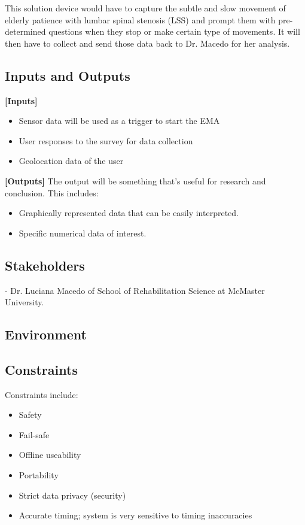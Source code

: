 \documentclass{article}
\begin{document}
This solution device would have to capture the subtle and slow movement of elderly patience with lumbar spinal stenosis (LSS) and prompt them with pre-determined questions when they stop or make certain type of  movements. It will then have to collect and send those data back to Dr. Macedo for her analysis.

\subsection{Inputs and Outputs}

\textbf{[Inputs]}
\begin{itemize}
    \item Sensor data will be used as a trigger to start the EMA
    \item User responses to the survey for data collection
    \item Geolocation data of the user
\end{itemize}
\pagebreak
\textbf{[Outputs]}
\linebreak
The output will be something that's useful for research and conclusion. This includes:
\begin{itemize}
    \item Graphically represented data that can be easily interpreted.
    \item Specific numerical data of interest.
\end{itemize}

\subsection{Stakeholders}

- Dr. Luciana Macedo of School of Rehabilitation Science at McMaster University.

\subsection{Environment}

\subsection{Constraints}
Constraints include:
\begin{itemize}
    \item Safety
    \item Fail-safe
    \item Offline useability
    \item Portability
    \item Strict data privacy (security)
    \item Accurate timing; system is very sensitive to timing inaccuracies
\end{itemize}
\pagebreak
\end{document}
